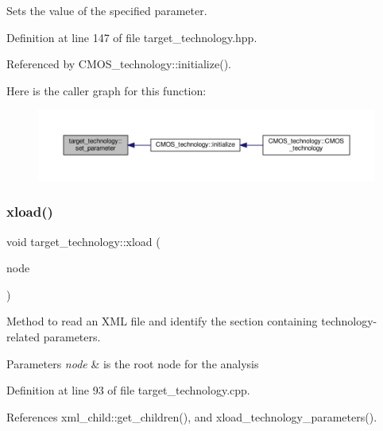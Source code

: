 Sets the value of the specified parameter. 



Definition at line 147 of file target\+\_\+technology.\+hpp.



Referenced by C\+M\+O\+S\+\_\+technology\+::initialize().

Here is the caller graph for this function\+:
\nopagebreak
\begin{figure}[H]
\begin{center}
\leavevmode
\includegraphics[width=350pt]{d8/d05/classtarget__technology_a5ab437ee434569815da739feae3785bc_icgraph}
\end{center}
\end{figure}
\mbox{\label{classtarget__technology_aef59dfe918223198c592fa318f56de2b}} 
\subsubsection{\texorpdfstring{xload()}{xload()}}
{\footnotesize\ttfamily void target\+\_\+technology\+::xload (\begin{DoxyParamCaption}\item[{const \hyperlink{classxml__element}{xml\+\_\+element} $\ast$}]{node }\end{DoxyParamCaption})\hspace{0.3cm}{\ttfamily [protected]}}



Method to read an X\+ML file and identify the section containing technology-\/related parameters. 


\begin{DoxyParams}{Parameters}
{\em node} & is the root node for the analysis \\
\hline
\end{DoxyParams}


Definition at line 93 of file target\+\_\+technology.\+cpp.



References xml\+\_\+child\+::get\+\_\+children(), and xload\+\_\+technology\+\_\+parameters().



